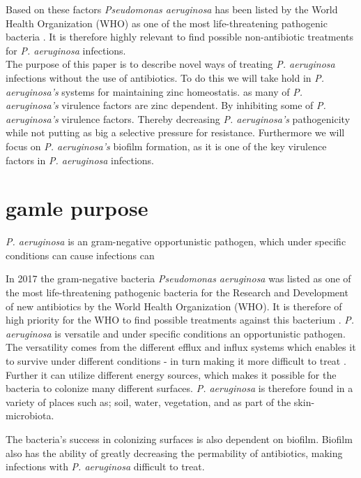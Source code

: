 Based on these factors \textit{Pseudomonas aeruginosa} has been listed by the World Health Organization (WHO) as one of the most life-threatening pathogenic bacteria \cite{Pachori2019EmergenceReview}. It is therefore highly relevant to find possible non-antibiotic treatments for \textit{P. aeruginosa} infections.\\ 
 The purpose of this paper is to describe novel ways of treating \textit{P. aeruginosa} infections without the use of antibiotics. To do this we will take hold in \textit{P. aeruginosa's} systems for maintaining zinc homeostatis.  as many of \textit{P. aeruginosa's} virulence factors are zinc dependent.  By inhibiting some of \textit{P. aeruginosa's} virulence factors. Thereby decreasing \textit{P. aeruginosa's} pathogenicity while not putting as big a selective pressure for resistance.  Furthermore we will focus on \textit{P. aeruginosa's} biofilm formation, as it is one of the key virulence factors in \textit{P. aeruginosa} infections.







\section{gamle purpose}
\textit{P. aeruginosa} is an gram-negative opportunistic pathogen, which under specific conditions can cause infections can 


In 2017 the gram-negative bacteria \textit{Pseudomonas aeruginosa} was listed as one of the most life-threatening pathogenic bacteria for the Research and Development of new antibiotics by the World Health Organization (WHO). It is therefore of high priority for the WHO to find possible treatments against this bacterium \cite{Pachori2019EmergenceReview}. \textit{P. aeruginosa} is versatile and under specific conditions an opportunistic pathogen. The versatility comes from  the different efflux and influx systems which enables it to survive under different conditions - in turn making it more difficult to treat \cite{Mastropasqua2018EfficientLung} \cite{Lyczak2000EstablishmentOpportunist}. Further it can utilize different energy sources, which makes it possible for the bacteria to colonize many different surfaces. \textit{P. aeruginosa} is therefore found in a variety of places such as; soil, water, vegetation, and as part of the skin-microbiota. 

The bacteria's success in colonizing surfaces is also dependent on biofilm. Biofilm also has the ability of greatly decreasing the permability of antibiotics, making infections with \textit{P. aeruginosa} difficult to treat.



